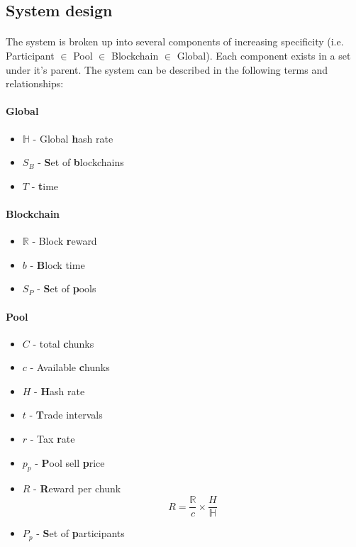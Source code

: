 \subsection{System design} %

\paragraph{} The system is broken up into several components of increasing specificity (i.e. Participant $\in$ Pool $\in$ Blockchain $\in$ Global). Each component exists in a set under it's parent. The system can be described in the following terms and relationships:

\paragraph{Global} 

\begin{itemize}
  \item $\mathbb{H}$ - Global \textbf{h}ash rate
  \item $S_B$ - \textbf{S}et of \textbf{b}lockchains
  \item $T$ - \textbf{t}ime
\end{itemize}

\paragraph{Blockchain}

\begin{itemize}
  \item $\mathbb{R}$ - Block \textbf{r}eward
  \item $b$ - \textbf{B}lock time
  \item $S_P$ - \textbf{S}et of \textbf{p}ools
\end{itemize}

\paragraph{Pool}

\begin{itemize}
  \item $C$ - total \textbf{c}hunks
  \item $c$ - Available \textbf{c}hunks
  \item $H$ - \textbf{H}ash rate
  \item $t$ - \textbf{T}rade intervals 
  \item $r$ - Tax \textbf{r}ate
  \item $p_{p}$ - \textbf{P}ool sell \textbf{p}rice
  \item $R$ - \textbf{R}eward per chunk 
    \begin{equation} \label{equation:chunkreward}
      R = \frac{\mathbb{R}}{c} \times \frac{H}{\mathbb{H}}
    \end{equation}
  \item $P_p$ - \textbf{S}et of \textbf{p}articipants
\end{itemize}

